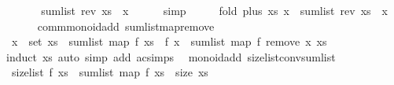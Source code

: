 \begin{isabellebody}
\ \ \isamarkupfalse%
\ \isamarkupfalse%
\ {\isachardoublequoteopen}{\isasymdots}\ {\isacharequal}{\kern0pt}\ sum{\isacharunderscore}{\kern0pt}list\ {\isacharparenleft}{\kern0pt}rev\ xs{\isacharparenright}{\kern0pt}\ {\isacharplus}{\kern0pt}\ x{\isachardoublequoteclose}\isanewline
\ \ \ \ \isamarkupfalse%
\ simp\isanewline
\ \ \isamarkupfalse%
\ \isamarkupfalse%
\ {\isachardoublequoteopen}fold\ plus\ xs\ x\ {\isacharequal}{\kern0pt}\ sum{\isacharunderscore}{\kern0pt}list\ {\isacharparenleft}{\kern0pt}rev\ xs{\isacharparenright}{\kern0pt}\ {\isacharplus}{\kern0pt}\ x{\isachardoublequoteclose}\isanewline
\ \ \ \ \isacommand{{\isachardot}{\kern0pt}}\isamarkupfalse%
\isanewline
{}\isamarkupfalse%
%
\endisatagproof
{\isafoldproof}%
%
\isadelimproof
\isanewline
%
\endisadelimproof
\isanewline
{}\isamarkupfalse%
\ {\isacharparenleft}{\kern0pt}\ comm{\isacharunderscore}{\kern0pt}monoid{\isacharunderscore}{\kern0pt}add{\isacharparenright}{\kern0pt}\ sum{\isacharunderscore}{\kern0pt}list{\isacharunderscore}{\kern0pt}map{\isacharunderscore}{\kern0pt}remove{}{\isacharcolon}{\kern0pt}\isanewline
\ \ {\isachardoublequoteopen}x\ {\isasymin}\ set\ xs\ {\isasymLongrightarrow}\ sum{\isacharunderscore}{\kern0pt}list\ {\isacharparenleft}{\kern0pt}map\ f\ xs{\isacharparenright}{\kern0pt}\ {\isacharequal}{\kern0pt}\ f\ x\ {\isacharplus}{\kern0pt}\ sum{\isacharunderscore}{\kern0pt}list\ {\isacharparenleft}{\kern0pt}map\ f\ {\isacharparenleft}{\kern0pt}remove{}\ x\ xs{\isacharparenright}{\kern0pt}{\isacharparenright}{\kern0pt}{\isachardoublequoteclose}\isanewline
%
\isadelimproof
\ \ %
\endisadelimproof
%
\isatagproof
{}\isamarkupfalse%
\ {\isacharparenleft}{\kern0pt}induct\ xs{\isacharparenright}{\kern0pt}\ {\isacharparenleft}{\kern0pt}auto\ simp\ add{\isacharcolon}{\kern0pt}\ ac{\isacharunderscore}{\kern0pt}simps{\isacharparenright}{\kern0pt}%
\endisatagproof
{\isafoldproof}%
%
\isadelimproof
\isanewline
%
\endisadelimproof
\isanewline
{}\isamarkupfalse%
\ {\isacharparenleft}{\kern0pt}\ monoid{\isacharunderscore}{\kern0pt}add{\isacharparenright}{\kern0pt}\ size{\isacharunderscore}{\kern0pt}list{\isacharunderscore}{\kern0pt}conv{\isacharunderscore}{\kern0pt}sum{\isacharunderscore}{\kern0pt}list{\isacharcolon}{\kern0pt}\isanewline
\ \ {\isachardoublequoteopen}size{\isacharunderscore}{\kern0pt}list\ f\ xs\ {\isacharequal}{\kern0pt}\ sum{\isacharunderscore}{\kern0pt}list\ {\isacharparenleft}{\kern0pt}map\ f\ xs{\isacharparenright}{\kern0pt}\ {\isacharplus}{\kern0pt}\ size\ xs{\isachardoublequoteclose}\isanewline

\end{isabellebody}
